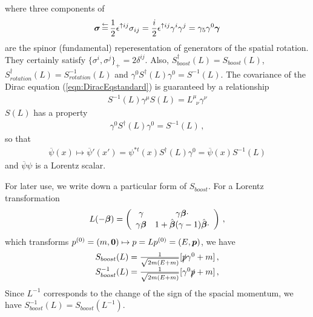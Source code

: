 where three components of
\begin{eqnarray}
\mbox{\boldmath $\sigma$}  \,\mbox{$\stackrel{\leftarrow}{=}$}\, 
\frac{1}{2} \epsilon^{\uparrow ij}\sigma_{ij}
=
\frac{i}{2} \epsilon^{\uparrow ij} \gamma^i \gamma^j
=
\gamma_5 \gamma^0 \mbox{\boldmath $\gamma$}
\label{eqn:DiGenRotation}
\end{eqnarray}
are the spinor (fundamental) reperesentation of generators of the spatial rotation.
They certainly satisfy $\{ \sigma^i, \sigma^j \}_+ = 2 \delta^{ij}$. Also,
$S^\dagger_{boost}(L) = S_{boost}(L)$,
$S^\dagger_{rotation}(L) = S^{-1}_{rotation}(L)$ and
$\gamma^0 S^\dagger_{}(L) \gamma^0 = S^{-1}_{}(L)$.
The covariance of the Dirac equation (\ref{eqn:DiracEqstandard}) is guaranteed by
a relationship
\begin{eqnarray}
S^{-1}(L) \gamma^\mu S(L) = L^\mu_{\;\;\nu} \gamma^\nu
\label{eqn:LorentzTransfgammaApp}
\end{eqnarray}
$S(L)$ has a property
\begin{eqnarray}
\gamma^0 S^\dagger(L) \gamma^0 = S^{-1}(L)\,,
\end{eqnarray}
so that
\begin{eqnarray}
\overline{\psi}(x) \mapsto {\overline{\psi}}'(x') = \psi^{*t} (x) S^\dagger(L) \gamma^0
= \overline{\psi}(x) S^{-1}(L)
\end{eqnarray}
and $\overline{\psi} \psi$ is a Lorentz scalar.

For later use, we write down a particular form of $S_{boost}$.
For a Lorentz transformation
\begin{eqnarray}
L(-\mbox{\boldmath $\beta$}) = \left(
\begin{array}{cc}
\gamma &
 \gamma \mbox{\boldmath $\beta$} \cdot
\\
\gamma  \mbox{\boldmath $\beta$} &
1 + \hat{\mbox{\boldmath $\beta$}} (\gamma - 1) \hat{\mbox{\boldmath $\beta$}} \cdot
\end{array}
\right)\,,
\end{eqnarray}
which transforms $p^{(0)}= (m, \mbox{\boldmath $0$}) \mapsto p = L p^{(0)} = (E, \mbox{\boldmath $p$})$,
we have
\begin{eqnarray}
\begin{array}{l}
S_{boost}(L)
=
\frac{1}{\sqrt{2m(E + m)}}
[ \slashed{p} \gamma^0 + m ]\,,
\\
S_{boost}^{-1}(L)
=
\frac{1}{\sqrt{2m(E + m)}}
[ \gamma^0 \slashed{p}  + m ]\,,
\end{array}
\end{eqnarray}
Since $L^{-1}$ corresponds to the change of the sign of the spacial momentum,
we have $S_{boost}^{-1}(L) = S_{boost}(L^{-1})$.



